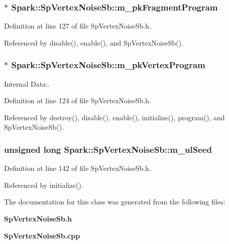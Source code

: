 \subsubsection{$\ast$ {\bf Spark::Sp\-Vertex\-Noise\-Sb::m\_\-pk\-Fragment\-Program}\hspace{0.3cm}{\tt  [protected]}}\label{classSpark_1_1SpVertexNoiseSb_p1}


Definition at line 127 of file Sp\-Vertex\-Noise\-Sb.h.

Referenced by disable(), enable(), and Sp\-Vertex\-Noise\-Sb().
\subsubsection{$\ast$ {\bf Spark::Sp\-Vertex\-Noise\-Sb::m\_\-pk\-Vertex\-Program}\hspace{0.3cm}{\tt  [protected]}}\label{classSpark_1_1SpVertexNoiseSb_p0}


Internal Data:. 

Definition at line 124 of file Sp\-Vertex\-Noise\-Sb.h.

Referenced by destroy(), disable(), enable(), initialize(), program(), and Sp\-Vertex\-Noise\-Sb().
\subsubsection{\setlength{\rightskip}{0pt plus 5cm}unsigned long {\bf Spark::Sp\-Vertex\-Noise\-Sb::m\_\-ul\-Seed}\hspace{0.3cm}{\tt  [protected]}}\label{classSpark_1_1SpVertexNoiseSb_p6}


Definition at line 142 of file Sp\-Vertex\-Noise\-Sb.h.

Referenced by initialize().

The documentation for this class was generated from the following files:\begin{CompactItemize}
\item 
{\bf Sp\-Vertex\-Noise\-Sb.h}\item 
{\bf Sp\-Vertex\-Noise\-Sb.cpp}\end{CompactItemize}
